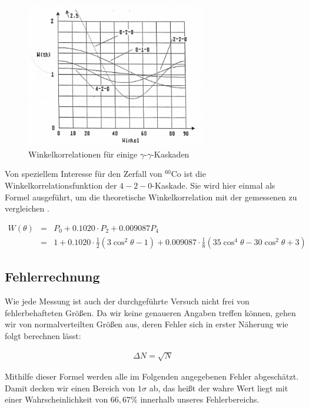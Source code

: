 \documentclass[11pt]{scrartcl}
\begin{document}
\begin{figure}[htbp]  
     \includegraphics[width=0.7\textwidth]{Winkelverteilung.pdf}
  \caption{Winkelkorrelationen für einige $\gamma$-$\gamma$-Kaskaden \cite{versuch}}
  \label{winkelvert}
\end{figure}

Von speziellem Interesse für den Zerfall von $^60$Co ist die Winkelkorrelationsfunktion der 
$4-2-0$-Kaskade. Sie wird hier einmal als Formel ausgeführt, um die theoretische Winkelkorrelation
mit der gemessenen zu vergleichen \cite{versuch}.

\begin{eqnarray}
 W(\theta)&=&P_0+0.1020\cdot P_2+0.009087 P_4\\
 &=&1+0.1020\cdot \frac{1}{2}(3 \cos^2 \theta - 1)+0.009087\cdot \frac{1}{8}(35\cos^4 \theta - 30 \cos^2 \theta +3)
 \label{winkelverteilung}
\end{eqnarray}


\subsection{Fehlerrechnung}

Wie jede Messung ist auch der durchgeführte Versuch nicht frei von fehlerbehafteten Größen. Da wir keine genaueren Angaben treffen können, gehen wir von normalverteilten Größen aus, deren Fehler sich in erster Näherung wie folgt berechnen lässt:

\begin{align}
\Delta N = \sqrt{N}
\end{align}

Mithilfe dieser Formel werden alle im Folgenden angegebenen Fehler abgeschätzt. Damit decken wir einen Bereich von $1\sigma$ ab, das heißt der wahre Wert liegt mit einer Wahrscheinlichkeit von $66,67\%$ innerhalb unseres Fehlerbereichs. 
\end{document}
